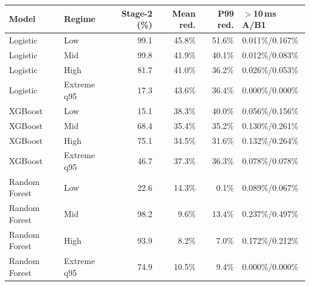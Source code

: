 \begin{tabular*}{\linewidth}{@{\extracolsep{\fill}}l l r r r l@{}}
\toprule
Model & Regime & Stage-2 (\%) & Mean red. & P99 red. & $>$10\,ms A/B1 \\
\midrule
Logistic & Low & 99.1 & 45.8\% & 51.6\% & 0.011\%/0.167\% \\
Logistic & Mid & 99.8 & 41.9\% & 40.1\% & 0.012\%/0.083\% \\
Logistic & High & 81.7 & 41.0\% & 36.2\% & 0.026\%/0.053\% \\
Logistic & Extreme q95 & 17.3 & 43.6\% & 36.4\% & 0.000\%/0.000\% \\
XGBoost & Low & 15.1 & 38.3\% & 40.0\% & 0.056\%/0.156\% \\
XGBoost & Mid & 68.4 & 35.4\% & 35.2\% & 0.130\%/0.261\% \\
XGBoost & High & 75.1 & 34.5\% & 31.6\% & 0.132\%/0.264\% \\
XGBoost & Extreme q95 & 46.7 & 37.3\% & 36.3\% & 0.078\%/0.078\% \\
Random Forest & Low & 22.6 & 14.3\% & 0.1\% & 0.089\%/0.067\% \\
Random Forest & Mid & 98.2 & 9.6\% & 13.4\% & 0.237\%/0.497\% \\
Random Forest & High & 93.9 & 8.2\% & 7.0\% & 0.172\%/0.212\% \\
Random Forest & Extreme q95 & 74.9 & 10.5\% & 9.4\% & 0.000\%/0.000\% \\
\bottomrule
\end{tabular*}